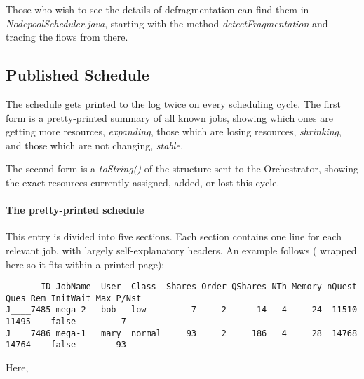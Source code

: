     Those who wish to see the details of defragmentation can find them in
    {\em NodepoolScheduler.java}, starting with the method {\em detectFragmentation}
    and tracing the flows from there.

\subsection{Published Schedule}

   The schedule gets printed to the log twice on every scheduling cycle.  The first
   form is a pretty-printed summary of all known jobs, showing which ones are
   getting more resources, {\em expanding}, those which are losing resources, 
   {\em shrinking}, and those which are not changing, {\em stable.}

   The second form is a {\em toString()} of the structure sent to the Orchestrator,
   showing the exact resources currently assigned, added, or lost this cycle.

   \paragraph{The pretty-printed schedule}
      This entry is divided into five sections.  Each section contains one line for
      each relevant job, with largely self-explanatory headers. An example follows (
      wrapped here so it fits within a printed page):
\begin{verbatim}
       ID JobName  User  Class  Shares Order QShares NTh Memory nQuest Ques Rem InitWait Max P/Nst
J____7485 mega-2   bob   low         7     2      14   4     24  11510    11495    false         7
J____7486 mega-1   mary  normal     93     2     186   4     28  14768    14764    false        93

\end{verbatim}
     Here,

